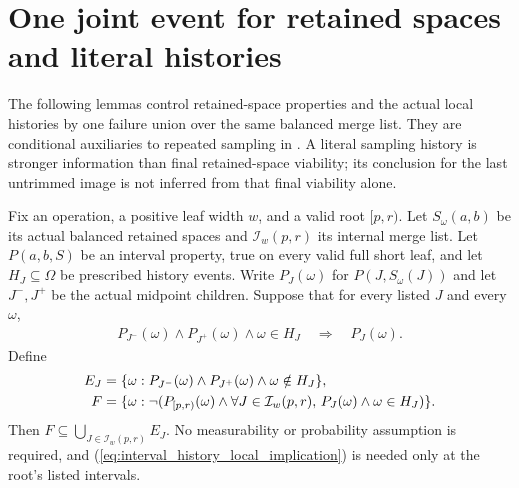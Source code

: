 \section{One joint event for retained spaces and literal histories}

The following lemmas control retained-space properties and the actual local
histories by one failure union over the same balanced merge list. They are
conditional auxiliaries to repeated sampling in
\cite[lines 749--755 and 1777--1817]{Arad2016RigorousRG}.
A literal sampling history is stronger information than final retained-space
viability; its conclusion for the last untrimmed image is not inferred from
that final viability alone.

\begin{lemma}
    \label{lem:balanced_interval_joint_history_ancestry}
    \leanok
    Fix an operation, a positive leaf width $w$, and a valid root $[p,r)$.
    Let $S_\omega(a,b)$ be its actual balanced retained spaces and
    $\mathcal I_w(p,r)$ its internal merge list. Let $P(a,b,S)$ be an
    interval property, true on every valid full short leaf, and let
    $H_J\subseteq\Omega$ be prescribed history events.
    Write $P_J(\omega)$ for $P(J,S_\omega(J))$ and let $J^-,J^+$ be
    the actual midpoint children. Suppose that for every listed $J$ and
    every $\omega$,
    \begin{align}
        P_{J^-}(\omega)\land P_{J^+}(\omega)\land\omega\in H_J
        \quad\Longrightarrow\quad P_J(\omega).
        \label{eq:interval_history_local_implication}
    \end{align}
    Define
    \begin{align}
        E_J & =\{\omega:P_{J^-}(\omega)\land P_{J^+}(\omega)
        \land\omega\notin H_J\},\notag                       \\
        F   & =\{\omega:\neg(P_{[p,r)}(\omega)\land
        \forall J\in\mathcal I_w(p,r),\,
        P_J(\omega)\land\omega\in H_J)\}.
        \label{eq:interval_history_failure_events}
    \end{align}
    Then $F\subseteq\bigcup_{J\in\mathcal I_w(p,r)}E_J$.
    No measurability or probability assumption is required, and
    (\ref{eq:interval_history_local_implication}) is needed only at the
    root's listed intervals.
\end{lemma}
